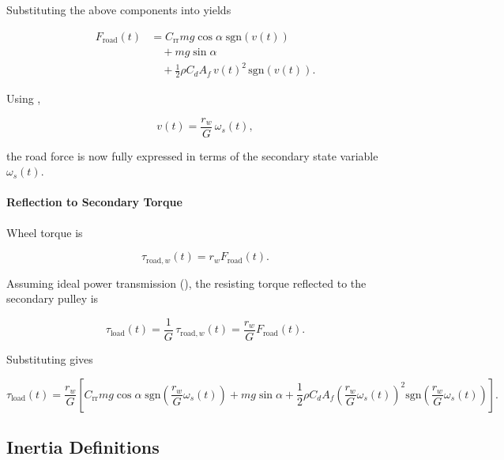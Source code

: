 \documentclass[11pt]{article}
\numberwithin{equation}{section}
\newcounter{assump}
\begin{document}
Substituting the above components into
 yields

\begin{align}
F_{\text{road}}(t)
&=
C_{\text{rr}} m g \cos\alpha
\;\mathrm{sgn}\!\left(v(t)\right)
\nonumber\\
&\quad
+
m g \sin\alpha
\nonumber\\
&\quad
+
\frac12 \rho C_d A_f
\, v(t)^2 \,\mathrm{sgn}\!\left(v(t)\right).
\label{eq:Froad_expanded}
\end{align}

Using ,

\[
v(t)
=
\frac{r_w}{G}\,\omega_s(t),
\]

the road force is now fully expressed in terms of the
secondary state variable $\omega_s(t)$.

\paragraph{Reflection to Secondary Torque}

Wheel torque is

\begin{equation}
\tau_{\text{road},w}(t)
=
r_w F_{\text{road}}(t).
\label{eq:tau_wheel}
\end{equation}

Assuming ideal power transmission
(),
the resisting torque reflected to the secondary pulley is

\begin{equation}
\tau_{\text{load}}(t)
=
\frac{1}{G}\,\tau_{\text{road},w}(t)
=
\frac{r_w}{G} F_{\text{road}}(t).
\label{eq:tau_load_basic}
\end{equation}

Substituting  gives

\begin{equation}
\boxed{
\tau_{\text{load}}(t)
=
\frac{r_w}{G}
\left[
C_{\text{rr}} m g \cos\alpha
\;\mathrm{sgn}\!\left(\frac{r_w}{G}\omega_s(t)\right)
+
m g \sin\alpha
+
\frac12 \rho C_d A_f
\left(\frac{r_w}{G}\omega_s(t)\right)^2
\mathrm{sgn}\!\left(\frac{r_w}{G}\omega_s(t)\right)
\right].
}
\label{eq:tau_load_final}
\end{equation}

\subsection{Inertia Definitions}
\end{document}
